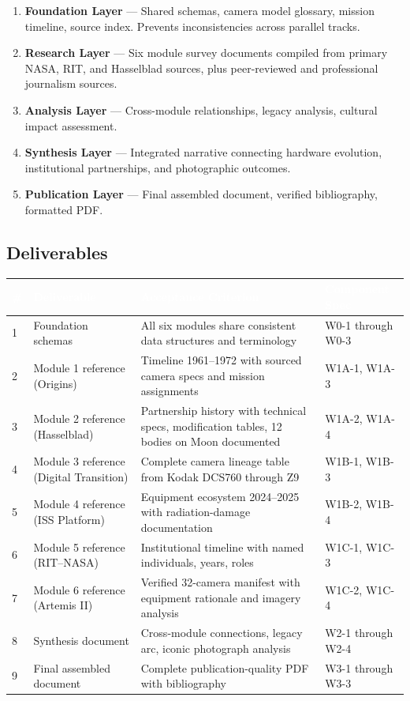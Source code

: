 \documentclass[11pt,letterpaper]{article}
\newcommand{\tableheader}[1]{\textbf{\sffamily\textcolor{white}{#1}}}
\begin{document}
\begin{enumerate}
  \item \textbf{Foundation Layer} --- Shared schemas, camera model glossary, mission timeline, source index. Prevents inconsistencies across parallel tracks.
  \item \textbf{Research Layer} --- Six module survey documents compiled from primary NASA, RIT, and Hasselblad sources, plus peer-reviewed and professional journalism sources.
  \item \textbf{Analysis Layer} --- Cross-module relationships, legacy analysis, cultural impact assessment.
  \item \textbf{Synthesis Layer} --- Integrated narrative connecting hardware evolution, institutional partnerships, and photographic outcomes.
  \item \textbf{Publication Layer} --- Final assembled document, verified bibliography, formatted PDF.
\end{enumerate}

\subsection{Deliverables}

\begin{center}
\begin{tabularx}{\textwidth}{C{0.5cm}L{3.5cm}XL{3cm}}
\toprule
{}
\tableheader{\#} & \tableheader{Deliverable} & \tableheader{Acceptance Criterion} & \tableheader{Component Spec} \\
 & Foundation schemas & All six modules share consistent data structures and terminology & W0-1 through W0-3 \\
2 & Module 1 reference (Origins) & Timeline 1961--1972 with sourced camera specs and mission assignments & W1A-1, W1A-3 \\
3 & Module 2 reference (Hasselblad) & Partnership history with technical specs, modification tables, 12 bodies on Moon documented & W1A-2, W1A-4 \\
4 & Module 3 reference (Digital Transition) & Complete camera lineage table from Kodak DCS760 through Z9 & W1B-1, W1B-3 \\
5 & Module 4 reference (ISS Platform) & Equipment ecosystem 2024--2025 with radiation-damage documentation & W1B-2, W1B-4 \\
6 & Module 5 reference (RIT--NASA) & Institutional timeline with named individuals, years, roles & W1C-1, W1C-3 \\
7 & Module 6 reference (Artemis II) & Verified 32-camera manifest with equipment rationale and imagery analysis & W1C-2, W1C-4 \\
8 & Synthesis document & Cross-module connections, legacy arc, iconic photograph analysis & W2-1 through W2-4 \\
9 & Final assembled document & Complete publication-quality PDF with bibliography & W3-1 through W3-3 \\
\bottomrule
\end{tabularx}
\end{center}
\end{document}

